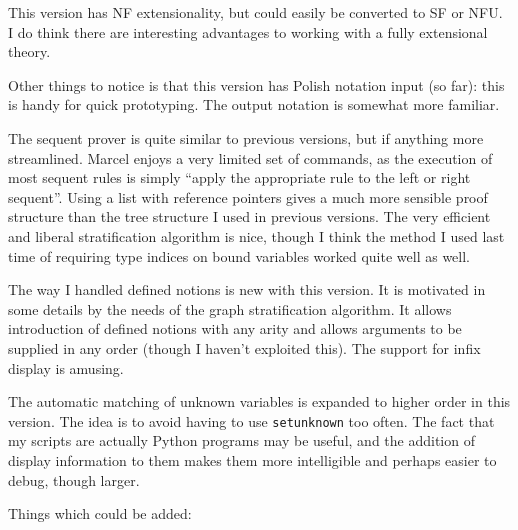 \documentclass{article}
\begin{document}
 This version has NF extensionality, but could easily be converted to SF or NFU.  I do think there are interesting advantages to working with a fully extensional theory.
 
 Other things to notice is that this version has Polish notation input (so far):  this is handy for quick prototyping.  The output notation is somewhat more familiar.
 
 The sequent prover is quite similar to previous versions, but if anything more streamlined.  Marcel enjoys a very limited set of commands, as the execution of most sequent rules is simply ``apply the appropriate rule to the left or right sequent''.   Using a list with reference pointers gives a much more sensible proof structure than the tree structure
 I used in previous versions.  The very efficient and liberal stratification algorithm is nice, though I think the method I used last time of requiring type indices on bound variables worked quite well as well.
 
 The way I handled defined notions is new with this version.  It is motivated in some details by the needs of the graph stratification algorithm.  It allows introduction of defined notions with any arity and allows arguments to be supplied in any order (though I haven't exploited this).  The support for infix display is amusing.
 
 The automatic matching of unknown variables is expanded to higher order in this version.  The idea is to avoid
 having to use {\tt setunknown} too often.  The fact that my scripts are actually Python programs may be useful, and the
 addition of display information to them makes them more intelligible and perhaps easier to debug, though larger.
 
 Things which could be added:
 
\end{document}
